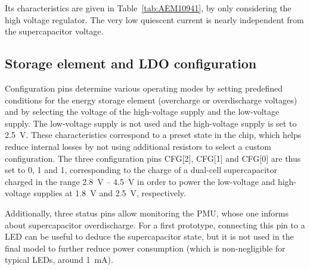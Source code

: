 \documentclass{EPL-master-thesis-covers-EN}
\begin{document}
Its characteristics are given in Table~\ref{tab:AEM10941}, by only considering the high voltage regulator. The very low quiescent current is nearly independent from the supercapacitor voltage.

\begin{table}[H]
\centering
{}
\caption{Characteristics of the AEM10941 PMU}
\label{tab:AEM10941}
\end{table}


\subsection*{Storage element and LDO configuration}

Configuration pins determine various operating modes by setting predefined conditions for the energy storage element (overcharge or overdischarge voltages) and by selecting the voltage of the high-voltage supply and the low-voltage supply.
The low-voltage supply is not used and the high-voltage supply is set to \SI{2.5}{V}. These characteristics correspond to a preset state in the chip, which helps reduce internal losses by not using additional resistors to select a custom configuration. The three configuration pins CFG[2], CFG[1] and CFG[0] are thus set to 0, 1 and 1, corresponding to the charge of a dual-cell supercapacitor charged in the range \SI{2.8}{V} -- \SI{4.5}{V} in order to power the low-voltage and high-voltage supplies at \SI{1.8}{V} and \SI{2.5}{V}, respectively.

Additionally, three status pins allow monitoring the PMU, whose one informs about supercapacitor overdischarge. For a first prototype, connecting this pin to a LED can be useful to deduce the supercapacitor state, but it is not used in the final model to further reduce power consumption (which is non-negligible for typical LEDs, around \SI{1}{mA}).
\end{document}
